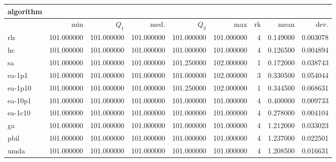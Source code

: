 \begin{tabular}{@{}l*{5}{>{{}}N{3}{0}}>{{}}N{2}{0}N{1}{3}N{1}{3}@{}}
\toprule
{algorithm} &  &  \\
\midrule
& {min} & {$Q_1$} & {med.} & {$Q_3$} & {max} & {rk} & {mean} & {dev.} \\
\midrule
rls & {\color{blue}} 101.000000 & {\color{blue}} 101.000000 & {\color{blue}} 101.000000 & 101.000000 & 101.000000 & 4 & 0.149000 & 0.003078 \\
 hc & {\color{blue}} 101.000000 & {\color{blue}} 101.000000 & {\color{blue}} 101.000000 & 101.000000 & 101.000000 & 4 & 0.126500 & 0.004894 \\
 sa & {\color{blue}} 101.000000 & {\color{blue}} 101.000000 & {\color{blue}} 101.000000 & {\color{blue}} 101.250000 & {\color{blue}} 102.000000 & 1 & 0.172000 & 0.038743 \\
 ea-1p1 & {\color{blue}} 101.000000 & {\color{blue}} 101.000000 & {\color{blue}} 101.000000 & 101.000000 & {\color{blue}} 102.000000 & 3 & 0.330500 & 0.054044 \\
 ea-1p10 & {\color{blue}} 101.000000 & {\color{blue}} 101.000000 & {\color{blue}} 101.000000 & {\color{blue}} 101.250000 & {\color{blue}} 102.000000 & 1 & 0.344500 & 0.068631 \\
 ea-10p1 & {\color{blue}} 101.000000 & {\color{blue}} 101.000000 & {\color{blue}} 101.000000 & 101.000000 & 101.000000 & 4 & 0.400000 & 0.009733 \\
 ea-1c10 & {\color{blue}} 101.000000 & {\color{blue}} 101.000000 & {\color{blue}} 101.000000 & 101.000000 & 101.000000 & 4 & 0.278000 & 0.004104 \\
 ga & {\color{blue}} 101.000000 & {\color{blue}} 101.000000 & {\color{blue}} 101.000000 & 101.000000 & 101.000000 & 4 & 1.212000 & 0.033023 \\
 pbil & {\color{blue}} 101.000000 & {\color{blue}} 101.000000 & {\color{blue}} 101.000000 & 101.000000 & 101.000000 & 4 & 1.237000 & 0.022501 \\
 umda & {\color{blue}} 101.000000 & {\color{blue}} 101.000000 & {\color{blue}} 101.000000 & 101.000000 & 101.000000 & 4 & 1.208500 & 0.016631 \\
 \bottomrule
\end{tabular}
